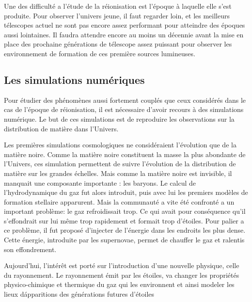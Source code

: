 
Une des difficulté a l'étude de la réionisation est l'époque à laquelle elle s'est produite. %
Pour observer l'univers jeune, il faut regarder loin, et les meilleurs télescopes actuel ne sont pas encore assez performant pour atteindre des époques aussi lointaines.
Il faudra attendre encore au moins un décennie avant la mise en place des prochaine générations de télescope assez puissant pour observer les environnement de formation de ces première sources lumineuses.

\subsection*{Les simulations numériques}
Pour étudier des phénomènes aussi fortement couplés que ceux considérés dans le cas de l'époque de réionisation, il est nécessaire d'avoir recours à des simulations numérique. 
Le but de ces simulations est de reproduire les observations sur la distribution de matière dans l'Univers.

Les premières simulations cosmologiques ne considéraient l'évolution que de la matière noire. %
Comme la matière noire constituent la masse la plus abondante de l'Univers, ces simulation permettent de suivre l'évolution de la distribution de matière sur les grandes échelles. 
Mais comme la matière noire est invisible, il manquait une composante importante : les baryons.
Le calcul de l'hydrodynamique du gaz fut alors introduit, puis avec lui les premiers modèles de formation stellaire apparurent.
Mais la communauté a vite été confronté a un important problème: le gaz refroidissait trop.
Ce qui avait pour conséquence qu'il s'effondrait sur lui même trop rapidement et formait trop d'étoiles.
Pour palier a ce problème, il fut proposé d'injecter de l'énergie dans les endroits les plus dense.
Cette énergie, introduite par les supernovae, permet de chauffer le gaz et ralentis son effondrement. 

Aujourd'hui, l'intérêt est porté sur l'introduction d'une nouvelle physique, celle du rayonnement.
Le rayonnement émit par les étoiles, va changer les propriétés physico-chimique et thermique du gaz qui les environnent et ainsi modeler les lieux d\'apparitions des générations futures d'étoiles

